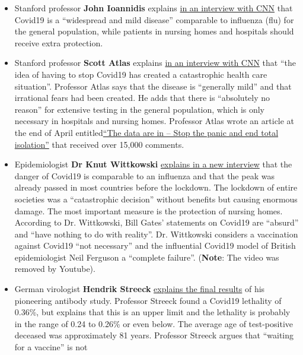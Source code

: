 \begin{itemize}
\tightlist
\item
  Stanford professor \textbf{John Ioannidis} explains
  \href{https://twitter.com/cnn/status/1256579248342564865}{in an
  interview with CNN} that Covid19 is a ``widespread and mild disease''
  comparable to influenza (flu) for the general population, while
  patients in nursing homes and hospitals should receive extra
  protection.
\item
  Stanford professor \textbf{Scott Atlas} explains
  \href{https://www.facebook.com/cnn/posts/10160799274796509}{in an
  interview with CNN} that ``the idea of having to stop Covid19 has
  created a catastrophic health care situation''. Professor Atlas says
  that the disease is ``generally mild'' and that irrational fears had
  been created. He adds that there is ``absolutely no reason'' for
  extensive testing in the general population, which is only necessary
  in hospitals and nursing homes. Professor Atlas wrote an article at
  the end of April
  entitled\href{https://thehill.com/opinion/healthcare/494034-the-data-are-in-stop-the-panic-and-end-the-total-isolation}{``The
  data are in -- Stop the panic and end total isolation''} that received
  over 15,000 comments.
\item
  Epidemiologist \textbf{Dr Knut Wittkowski}
  \href{https://www.thepressandthepublic.com/post/perspectives-on-the-pandemic-v}{explains
  in a new interview} that the danger of Covid19 is comparable to an
  influenza and that the peak was already passed in most countries
  before the lockdown. The lockdown of entire societies was a
  ``catastrophic decision'' without benefits but causing enormous
  damage. The most important measure is the protection of nursing homes.
  According to Dr. Wittkowski, Bill Gates' statements on Covid19 are
  ``absurd'' and ``have nothing to do with reality''. Dr. Wittkowski
  considers a vaccination against Covid19 ``not necessary'' and the
  influential Covid19 model of British epidemiologist Neil Ferguson a
  ``complete failure''. (\textbf{Note}: The video was removed by
  Youtube).
\item
  German virologist \textbf{Hendrik Streeck}
  \href{https://www.youtube.com/watch?v=vrL9QKGQrWk}{explains the final
  results} of his pioneering antibody study. Professor Streeck found a
  Covid19 lethality of 0.36\%, but explains that this is an upper limit
  and the lethality is probably in the range of 0.24 to 0.26\% or even
  below. The average age of test-positive deceased was approximately 81
  years. Professor Streeck argues that ``waiting for a vaccine'' is not

\end{itemize}
